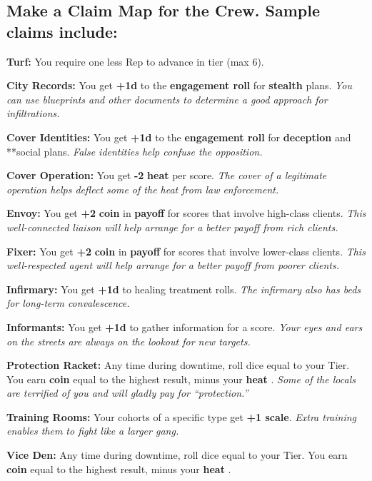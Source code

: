 \documentclass[11pt,oneside]{book}
\newcommand{\gameterm}[1]{\textbf{#1}}
\begin{document}
\subsection{Make a Claim Map for the Crew. Sample claims include:}

\gameterm{Turf: } You require one less Rep to advance in tier (max 6).

\gameterm{City Records:}  You get \textbf{+1d} to the \textbf{engagement roll} for \textbf{stealth} plans. \emph{You can use blueprints and other documents to determine a good approach for infiltrations.}

\gameterm{Cover Identities: }  You get \textbf{+1d} to the \textbf{engagement roll} for \textbf{deception} and **social plans. \emph{False identities help confuse the opposition.}

\gameterm{Cover Operation: }  You get \textbf{-2} \gameterm{heat}  per score. \emph{The cover of a legitimate operation helps deflect some of the heat from law enforcement.}

\gameterm{Envoy:}  You get \textbf{+2} \gameterm{coin}  in \textbf{payoff} for scores that involve high-class clients. \emph{This well-connected liaison will help arrange for a better payoff from rich clients.}

\gameterm{Fixer:}  You get \textbf{+2} \gameterm{coin}  in \textbf{payoff} for scores that involve lower-class clients. \emph{This well-respected agent will help arrange for a better payoff from poorer clients.}

\gameterm{Infirmary:}  You get \textbf{+1d} to healing treatment rolls. \emph{The infirmary also has beds for long-term convalescence.}

\gameterm{Informants:}  You get \textbf{+1d} to gather information for a score. \emph{Your eyes and ears on the streets are always on the lookout for new targets.}

\gameterm{Protection Racket:}  Any time during downtime, roll dice equal to your Tier. You earn \gameterm{coin}  equal to the highest result, minus your \gameterm{heat} . \emph{Some of the locals are terrified of you and will gladly pay for “protection.”}

\gameterm{Training Rooms:}  Your cohorts of a specific type get \textbf{+1 scale}. \emph{Extra training enables them to fight like a larger gang.}

\gameterm{Vice Den:}  Any time during downtime, roll dice equal to your Tier. You earn \gameterm{coin}  equal to the highest result, minus your \gameterm{heat} .
\end{document}
